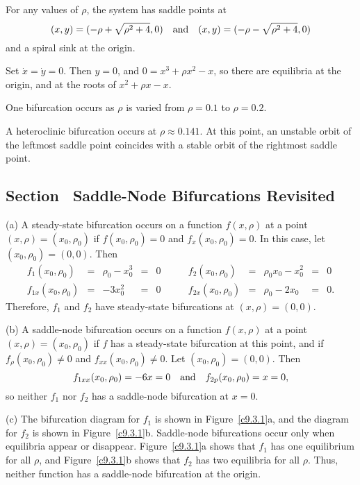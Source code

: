 \documentclass{ximera}
\begin{document}
\clearpage

\ans For any values of $\rho$, the system has saddle points at
\[
(x,y) = (-\rho + \sqrt{\rho^2 + 4},0) \quad\mbox{and}\quad
(x,y) = (-\rho - \sqrt{\rho^2 + 4},0)
\]
and a spiral sink at the origin.

\soln Set $\dot{x} = \dot{y} = 0$.  Then $y = 0$, and
$0 = x^3 + \rho x^2 - x$, so there are equilibria at the origin, and at
the roots of $x^2 + \rho x - x$.

One bifurcation occurs as $\rho$ is varied from $\rho = 0.1$ to $\rho = 0.2$.

A heteroclinic bifurcation occurs at $\rho \approx 0.141$.  At this
point, an unstable orbit of the leftmost saddle point coincides with a
stable orbit of the rightmost saddle point.



\subsection*{Section~\protect{\ref{S:SNB}} Saddle-Node Bifurcations Revisited}

(a) A steady-state bifurcation occurs on a function $f(x,\rho)$ at a
point $(x,\rho) = (x_0,\rho_0)$ if $f(x_0,\rho_0) = 0$ and
$f_x(x_0,\rho_0) = 0$.  In this case, let $(x_0,\rho_0) = (0,0)$.
Then
\[ \begin{array}{rcccl}
f_1(x_0,\rho_0) & = & \rho_0 - x_0^3 & = & 0 \\
f_{1x}(x_0,\rho_0) & = & -3x_0^2 & = & 0 \end{array}
\qquad
\begin{array}{rcccl}
f_2(x_0,\rho_0) & = & \rho_0x_0 - x_0^2 & = & 0 \\
f_{2x}(x_0,\rho_0) & = & \rho_0 - 2x_0 & = & 0. \end{array}
\]
Therefore, $f_1$ and $f_2$ have steady-state bifurcations at $(x,\rho)
= (0,0)$.

(b) A saddle-node bifurcation occurs on a function $f(x,\rho)$ at a point
$(x,\rho) = (x_0,\rho_0)$ if $f$ has a steady-state bifurcation at this
point, and if $f_\rho(x_0,\rho_0) \neq 0$ and $f_{xx}(x_0,\rho_0) \neq 0$.
Let $(x_0,\rho_0) = (0,0)$.  Then
\[
f_{1xx}(x_0,\rho_0) = -6x = 0 \quad\mbox{and}\quad
f_{2p}(x_0,\rho_0) = x = 0,
\]
so neither $f_1$ nor $f_2$ has a saddle-node bifurcation at $x = 0$.

(c) The bifurcation diagram for $f_1$ is shown in Figure~\ref{c9.3.1}a, and
the diagram for $f_2$ is shown in Figure~\ref{c9.3.1}b.  Saddle-node
bifurcations occur only when equilibria appear or disappear.
Figure~\ref{c9.3.1}a shows that $f_1$ has one equilibrium for all $\rho$,
and Figure~\ref{c9.3.1}b shows that $f_2$ has two equilibria for all
$\rho$.  Thus, neither function has a saddle-node bifurcation at the origin.
\end{document}
